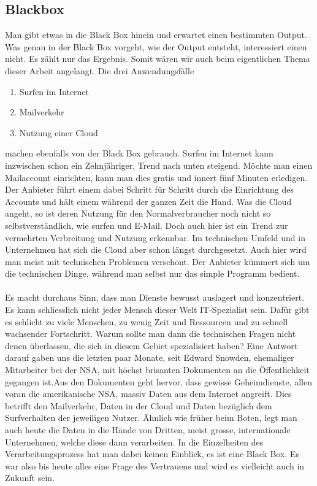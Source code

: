 \subsection{Blackbox}
Man gibt etwas in die Black Box hinein und erwartet einen bestimmten Output. Was genau in der Black Box vorgeht, wie der Output entsteht, interessiert einen nicht. Es zählt nur das Ergebnis. Somit wären wir auch beim eigentlichen Thema dieser Arbeit angelangt. Die drei Anwendungsfälle
\begin{enumerate}
\item Surfen im Internet
\item Mailverkehr
\item Nutzung einer Cloud
\end{enumerate}
machen ebenfalls von der Black Box gebrauch. Surfen im Internet kann inzwischen schon ein Zehnjähriger, Trend nach unten steigend. Möchte man einen Mailaccount einrichten, kann man dies gratis und innert fünf Minuten erledigen. Der Anbieter führt einem dabei Schritt für Schritt durch die Einrichtung des Accounts und hält einem während der ganzen Zeit die Hand. Was die Cloud angeht, so ist deren Nutzung für den Normalverbraucher noch nicht so selbstverständlich, wie surfen und E-Mail. Doch auch hier ist ein Trend zur vermehrten Verbreitung und Nutzung erkennbar. Im technischen Umfeld und in Unternehmen hat sich die Cloud aber schon längst durchgesetzt. Auch hier wird man meist mit technischen Problemen verschont. Der Anbieter kümmert sich um die technischen Dinge, während man selbst nur das simple Programm bedient.
\\
\\
Es macht durchaus Sinn, dass man Dienste bewusst auslagert und konzentriert. Es kann schliesslich nicht jeder Mensch dieser Welt IT-Spezialist sein. Dafür gibt es schlicht zu viele Menschen, zu wenig Zeit und Ressourcen und zu schnell wachsender Fortschritt. Warum sollte man dann die technischen Fragen nicht denen überlassen, die sich in diesem Gebiet spezialisiert haben? Eine Antwort darauf gaben uns die letzten paar Monate, seit Edward Snowden, ehemaliger Mitarbeiter bei der NSA, mit höchst brisanten Dokumenten an die Öffentlichkeit gegangen ist.Aus den Dokumenten geht hervor, dass gewisse Geheimdienste, allen voran die amerikanische NSA, massiv Daten aus dem Internet angreift. Dies betrifft den Mailverkehr, Daten in der Cloud und Daten bezüglich dem Surfverhalten der jeweiligen Nutzer. Ähnlich wie früher beim Boten, legt man auch heute die Daten in die Hände von Dritten, meist grosse, internationale Unternehmen, welche diese dann verarbeiten. In die Einzelheiten des Verarbeitungsprozess hat man dabei keinen Einblick, es ist eine Black Box. Es war also bis heute alles eine Frage des Vertrauens und wird es vielleicht auch in Zukunft sein.
